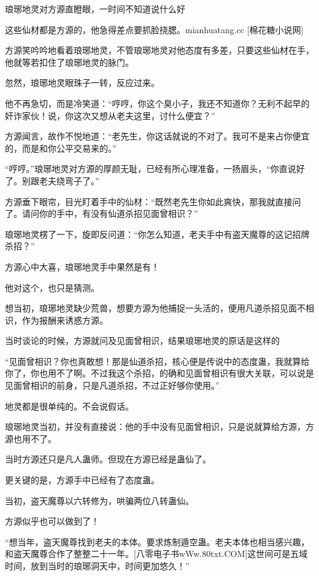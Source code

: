 
\begin{this_body}

琅琊地灵对方源直瞪眼，一时间不知道说什么好

这些仙材都是方源的，他急得差点要抓脸挠腮。mianhuatang.cc [棉花糖小说网]

方源笑吟吟地看着琅琊地灵，不管琅琊地灵对他态度有多差，只要这些仙材在手，他就等若扣住了琅琊地灵的脉门。

忽然，琅琊地灵眼珠子一转，反应过来。

他不再急切，而是冷笑道：“哼哼，你这个臭小子，我还不知道你？无利不起早的奸诈家伙！说，你这次又想从老夫这里，讨什么便宜？”

方源闻言，故作不悦地道：“老先生，你这话就说的不对了。我可不是来占你便宜的，而是和你公平交易来的。”

“哼哼。”琅琊地灵对方源的厚颜无耻，已经有所心理准备，一扬眉头，“你直说好了。别跟老夫绕弯子了。”

方源垂下眼帘，目光盯着手中的仙材：“既然老先生你如此爽快，那我就直接问了。请问你的手中，有没有仙道杀招见面曾相识？”

琅琊地灵楞了一下，旋即反问道：“你怎么知道，老夫手中有盗天魔尊的这记招牌杀招？”

方源心中大喜，琅琊地灵手中果然是有！

他对这个，也只是猜测。

想当初，琅琊地灵缺少荒兽，想要方源为他捕捉一头活的，便用凡道杀招见面不相识，作为报酬来诱惑方源。

当时谈论的时候，方源就问及见面曾相识，结果琅琊地灵的原话是这样的

“见面曾相识？你也真敢想！那是仙道杀招，核心便是传说中的态度蛊，我就算给你了，你也用不了啊。不过我这个杀招，的确和见面曾相识有很大关联，可以说是见面曾相识的前身，只是凡道杀招，不过正好够你使用。”

地灵都是很单纯的。不会说假话。

琅琊地灵当初，并没有直接说：他的手中没有见面曾相识，只是说就算给方源，方源也用不了。

当时方源还只是凡人蛊师。但现在方源已经是蛊仙了。

更关键的是，方源手中已经有了态度蛊。

当初，盗天魔尊以六转修为，哄骗两位八转蛊仙。

方源似乎也可以做到了！

“想当年，盗天魔尊找到老夫的本体。要求炼制遁空蛊。老夫本体也相当感兴趣，和盗天魔尊合作了整整二十一年。[八零电子书wWw.80txt.COM]这世间可是五域时间，放到当时的琅琊洞天中，时间更加悠久！”


\end{this_body}
